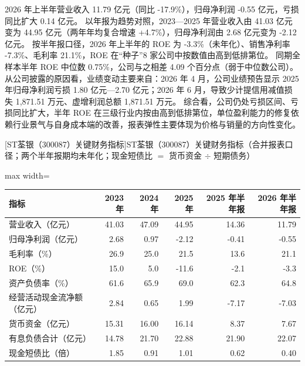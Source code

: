  2026 年上半年营业收入 11.79 亿元（同比 -17.9\%），归母净利润 -0.55 亿元，亏损同比扩大 0.14 亿元。 以年报为趋势对照，2023---2025 年营业收入由 41.03 亿元变为 44.95 亿元（两年年均复合增速 +4.7\%），归母净利润由 2.68 亿元变为 -2.12 亿元。 按半年报口径，2026 年上半年的 ROE 为 -3.3\%（未年化）、销售净利率 -7.3\%、毛利率 21.1\%，ROE 在“种子”8 家公司中按数值由高到低排第位。 同期全样本半年 ROE 中位数 0.75\%，公司与之相差 4.09 个百分点（弱于中位数公司）。 从公司披露的原因看，业绩变动主要来自：2026 年 4 月，公司业绩预告显示 2025 年归母净利润亏损 1.80 亿元—2.70 亿元；2026 年 6 月，导致少计提信用减值损失 1,871.51 万元、虚增利润总额 1,871.51 万元。 综合看，公司仍处亏损区间、亏损同比扩大，半年 ROE 在三级行业内按由高到低排第位，单位盈利能力的修复依赖行业景气与自身成本端的改善，报表弹性主要体现为价格与销量的方向性变化。

\begin{center}\small\setlength{\tabcolsep}{3.4pt}
[ST荃银（300087）关键财务指标]{ST荃银（300087）关键财务指标（合并报表口径；两个半年报期均未年化；现金短债比 $=$ 货币资金 $\div$ 短期债务）}
\begin{adjustbox}{max width=\textwidth}
\begin{tabular}{@{}lrrrrr@{}}
\toprule
指标 & 2023 年 & 2024 年 & 2025 年 & 2025 年半年报 & 2026 年半年报 \\
\midrule
营业收入（亿元） & 41.03 & 47.09 & 44.95 & 14.36 & 11.79 \\
归母净利润（亿元） & 2.68 & 0.97 & -2.12 & -0.41 & -0.55 \\
毛利率（\%） & 26.9 & 25.0 & 21.5 & 13.6 & 21.1 \\
ROE（\%） & 15.0 & 5.0 & -11.6 & -2.1 & -3.3 \\
资产负债率（\%） & 61.6 & 65.9 & 69.0 & 62.3 & 64.8 \\
经营活动现金流净额（亿元） & 2.84 & 0.65 & 1.99 & -7.17 & -7.03 \\
货币资金（亿元） & 15.31 & 16.00 & 16.14 & 8.37 & 7.67 \\
有息负债合计（亿元） & 14.78 & 21.70 & 22.88 & 21.90 & 22.07 \\
现金短债比（倍） & 1.85 & 0.91 & 1.01 & 0.62 & 0.40 \\
\bottomrule
\end{tabular}
\end{adjustbox}
\end{center}

